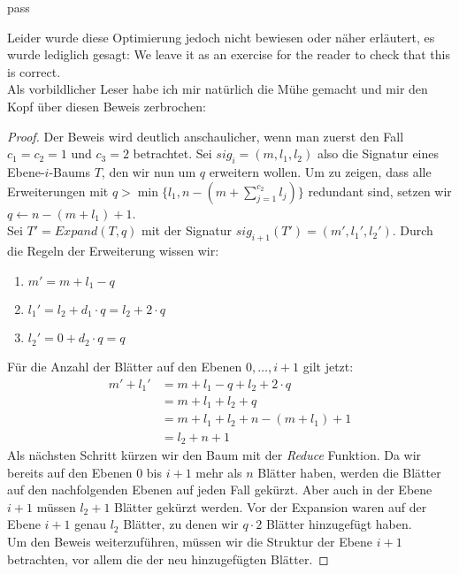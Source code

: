 pass\documentclass[a4paper,10pt,ngerman]{scrartcl}
\begin{document}
    Leider wurde diese Optimierung jedoch nicht bewiesen oder näher erläutert, es wurde lediglich gesagt: \glqq We leave it as an exercise for the reader to check that this is correct.\grqq \\
    Als vorbildlicher Leser habe ich mir natürlich die Mühe gemacht und mir den Kopf über diesen Beweis zerbrochen:
    \begin{proof}
        Der Beweis wird deutlich anschaulicher, wenn man zuerst den Fall $c_1 = c_2 = 1$ und $c_3 = 2$ betrachtet.
        Sei $sig_i = (m, l_1, l_2)$ also die Signatur eines Ebene-$i$-Baums $T$, den wir nun um $q$ erweitern wollen.
        Um zu zeigen, dass alle Erweiterungen mit $q > \min\{l_1, n - (m + \sum^{c_2}_{j=1} l_j)\}$ redundant sind, setzen wir $q \gets n - (m + l_1) + 1$. \\
        Sei $T' = Expand(T, q)$ mit der Signatur $sig_{i+1}(T') = (m', l_1', l_2')$.
        Durch die Regeln der Erweiterung wissen wir:
        \begin{enumerate}
            \item $m' = m + l_1 - q$
            \item $l_1' = l_2 + d_1 \cdot q = l_2 + 2 \cdot q$
            \item $l_2' = 0 + d_2 \cdot q = q$
        \end{enumerate}
        Für die Anzahl der Blätter auf den Ebenen $0, \dots, i + 1$ gilt jetzt:
        \begin{equation}
            \begin{aligned}
                m'+ l_1' &= m + l_1 - q + l_2 + 2 \cdot q\\
                &= m + l_1 + l_2 + q\\
                &= m + l_1 + l_2 + n - (m + l_1) + 1\\
                &= l_2 + n + 1
            \end{aligned}\label{eq:equation}
        \end{equation}
        Als nächsten Schritt kürzen wir den Baum mit der \textit{Reduce} Funktion.
        Da wir bereits auf den Ebenen $0$ bis $i+1$ mehr als $n$ Blätter haben, werden die Blätter auf den nachfolgenden Ebenen auf jeden Fall gekürzt.
        Aber auch in der Ebene $i + 1$ müssen $l_2 + 1$ Blätter gekürzt werden.
        Vor der Expansion waren auf der Ebene $i + 1$ genau $l_2$ Blätter, zu denen wir $q \cdot 2$ Blätter hinzugefügt haben. \\
        Um den Beweis weiterzuführen, müssen wir die Struktur der Ebene $i+1$ betrachten, vor allem die der neu hinzugefügten Blätter.

\end{proof}
\end{document}
